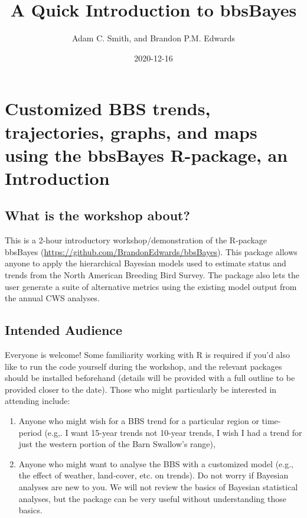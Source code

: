 \documentclass[
]{book}
\title{A Quick Introduction to bbsBayes}
\author{Adam C. Smith, and Brandon P.M. Edwards}
\date{2020-12-16}
\begin{document}
\maketitle

{
\setcounter{tocdepth}{1}
\tableofcontents
}
\hypertarget{customized-bbs-trends-trajectories-graphs-and-maps-using-the-bbsbayes-r-package-an-introduction}{%
\chapter{Customized BBS trends, trajectories, graphs, and maps using the bbsBayes R-package, an Introduction}\label{customized-bbs-trends-trajectories-graphs-and-maps-using-the-bbsbayes-r-package-an-introduction}}

\hypertarget{what-is-the-workshop-about}{%
\section{What is the workshop about?}\label{what-is-the-workshop-about}}

This is a 2-hour introductory workshop/demonstration of the R-package
bbsBayes (\url{https://github.com/BrandonEdwards/bbsBayes}). This package
allows anyone to apply the hierarchical Bayesian models used to estimate
status and trends from the North American Breeding Bird Survey. The
package also lets the user generate a suite of alternative metrics using
the existing model output from the annual CWS analyses.

\hypertarget{intended-audience}{%
\section{Intended Audience}\label{intended-audience}}

Everyone is welcome! Some familiarity working with R is required if
you'd also like to run the code yourself during the workshop, and the
relevant packages should be installed beforehand (details will be
provided with a full outline to be provided closer to the date). Those
who might particularly be interested in attending include:

\begin{enumerate}
\def\labelenumi{\arabic{enumi}.}
\item
  Anyone who might wish for a BBS trend for a particular region or
  time-period (e.g,. I want 15-year trends not 10-year trends, I wish
  I had a trend for just the western portion of the Barn Swallow's
  range),
\item
  Anyone who might want to analyse the BBS with a customized model
  (e.g., the effect of weather, land-cover, etc. on trends). Do not
  worry if Bayesian analyses are new to you. We will not review the
  basics of Bayesian statistical analyses, but the package can be very
  useful without understanding those basics.
\end{enumerate}
\end{document}
